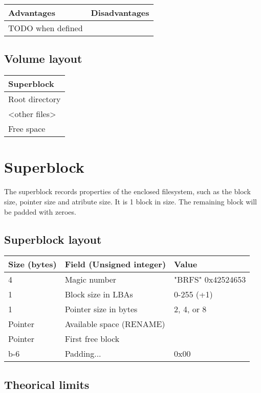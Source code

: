 \documentclass[]{article}
\begin{document}
	\begin{tabularx}{\textwidth}{X|X}
		\textbf{Advantages} & \textbf{Disadvantages} \\
		\hline
		TODO when defined
	\end{tabularx}

	\subsection{Volume layout}

	\begin{tabular}{|l|} 
		\hline
		Superblock \\ 
		\hline	
		Root directory \\
		\hline
		\textless other files\textgreater \\
		\hline
		Free space \\
		\hline
	\end{tabular}

	\section{Superblock}
	
	The superblock records properties of the enclosed filesystem, such as the block size, pointer size and atribute size. It is 1 block in size. The remaining block will be padded with zeroes.
	
	\subsection{Superblock layout}
	
	\begin{tabular}{|l|l|l|} 
		\hline
		\textbf{Size (bytes)} & \textbf{Field (Unsigned integer)} & \textbf{Value} \\ [0.5ex] 
		\hline
		4 & Magic number & "BRFS" 0x42524653  \\ 
		\hline
		1 & Block size in LBAs & 0-255 (+1) \\
		\hline
		1 & Pointer size in bytes & 2, 4, or 8 \\
		\hline
		Pointer & Available space (RENAME) & \\
		\hline
		Pointer & First free block & \\
		\hline
		b-6 & Padding... & 0x00 \\
		\hline	
	\end{tabular}

	\subsection{Theorical limits}
	
\end{document}
